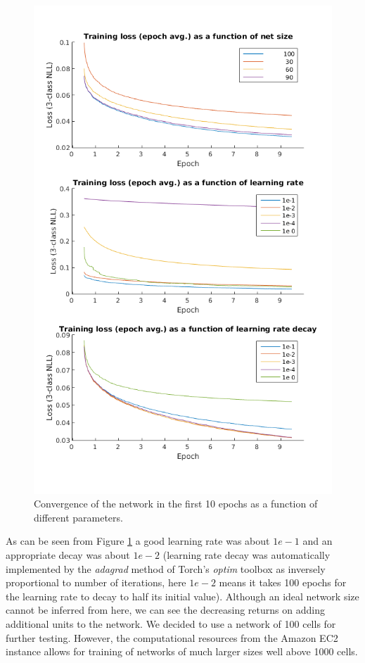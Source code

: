\documentclass{acm_proc_article-sp}
\begin{document}
\begin{figure}[H]
 \centering
 \includegraphics[scale=.45]{./figures/parameterSearch.png}
 \caption{Convergence of the network in the first 10 epochs as a function of different parameters.}
 \label{fig:paramSearch}
\end{figure}

As can be seen from Figure \ref{fig:paramSearch} a good learning rate was about $1e-1$ and an appropriate decay was about $1e-2$ (learning rate decay was automatically implemented by the \textit{adagrad} method of Torch's \textit{optim} toolbox as inversely proportional to number of iterations, here $1e-2$ means it takes 100 epochs for the learning rate to decay to half its initial value). Although an ideal network size cannot be inferred from here, we can see the decreasing returns on adding additional units to the network. We decided to use a network of 100 cells for further testing. However, the computational resources from the Amazon EC2 instance allows for training of networks of much larger sizes well above 1000 cells.
\end{document}
